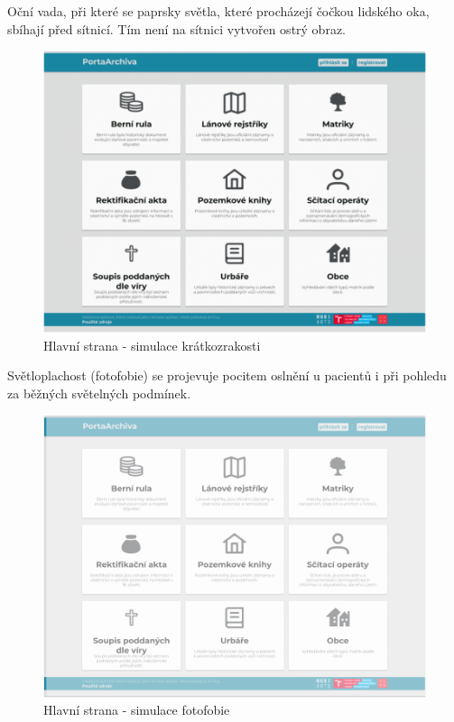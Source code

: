 \newpage
\noindent
Oční vada, při které se paprsky světla, které procházejí čočkou lidského oka, sbíhají před sítnicí. Tím není na sítnici vytvořen ostrý obraz.
\begin{figure}[htbp]
\centering
    \includegraphics[scale=.35]{obrazky-figures/testing/figma-eye-defects/Main - Blurred.png}
    \caption{Hlavní strana - simulace krátkozrakosti}
\end{figure}

\noindent
Světloplachost (fotofobie) se projevuje pocitem oslnění u pacientů i při pohledu za běžných světelných podmínek.
\begin{figure}[htbp]
\centering
    \includegraphics[scale=.35]{obrazky-figures/testing/figma-eye-defects/Main - Bright Light.png}
    \caption{Hlavní strana - simulace fotofobie}
\end{figure}

